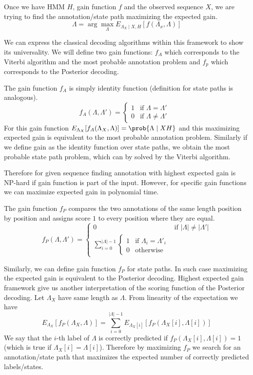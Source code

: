 Once we have HMM $H$, gain function $f$ and the observed sequence $X$,
we are trying to find the annotation/state path maximizing the expected gain. 
\begin{equation}
\Lambda = \arg\max_{\Lambda}E_{\Lambda_X\mid
X,H}\left[f\left(\Lambda_x,\Lambda\right)\right]
\end{equation}

We can express the classical decoding algorithms within this framework to show
its universality. We will define two gain functions: $f_A$ which corresponds to
the  
Viterbi algorithm and the most probable annotation problem and $f_p$ which
corresponds to 
the Posterior decoding.

The gain function $f_A$ is simply identity function (definition for state paths
is analogous).
\begin{equation}
f_A(\Lambda,\Lambda') = \begin{cases}
1 & \text{if $\Lambda = \Lambda'$ }\\
0 & \text{if $\Lambda \not=\Lambda'$}
\end{cases}
\end{equation}
For this gain function $E_{\Lambda_X}[f_A(\Lambda_X,\Lambda)]=\prob{\Lambda\mid
X H}$ and this
maximizing expected gain is 
equivalent to the most probable annotation problem. Similarly if we define gain
as the identity function over state paths, we obtain the most probable state
path problem, which can by solved by the Viterbi algorithm.

Therefore for given sequence finding annotation with highest expected gain is
NP-hard if gain function is part of the input. However, for specific gain
functions we can maximize expected gain in polynomial time.

The gain function $f_P$ compares the two annotations of the same length position
by position and assigns score $1$ to every position where they are equal.
\begin{equation}
f_P(\Lambda,\Lambda') = 
\begin{cases}
0 & \text{if $|\Lambda|\not=|\Lambda'|$}\\
\sum_{i=0}^{|\Lambda|-1}\begin{cases}
1 & \text{if $\Lambda_i=\Lambda'_i$}\\
0 & \text{otherwise}
\end{cases}
\end{cases}
\end{equation}

Similarly, we can define gain function $f_P$ for state paths. In such case
maximizing the expected gain is equivalent to the Posterior decoding. Highest
expected gain framework give us another interpretation of the scoring function of
the Posterior decoding. Let $\Lambda_X$  have same length as $\Lambda$. From
linearity of the expectation we have \[E_{\Lambda_X}[f_P(\Lambda_X,\Lambda)] =
\sum_{i=0}^{|\Lambda|-1}E_{\Lambda_X[i]}[f_P(\Lambda_X[i],\Lambda[i])]\] We say
that the $i$-th label of $\Lambda$ is correctly predicted if
$f_P(\Lambda_X[i],\Lambda[i])=1$ (which is true if $\Lambda_X[i]=\Lambda[i]$). Therefore  by maximizing $f_P$ we search for
an annotation/state path that maximizes the expected number of correctly
predicted labels/states.

